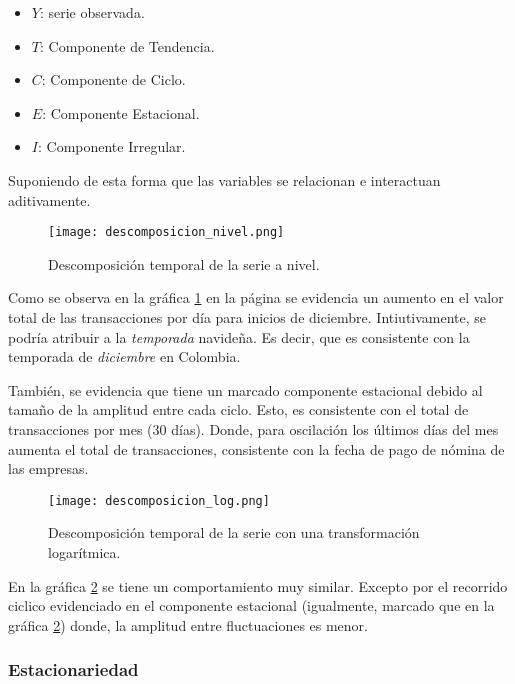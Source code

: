 \documentclass[a4paper]{article}
\begin{document}
\begin{itemize}
	\item $Y$: serie observada.
	\item $T$: Componente de Tendencia.
	\item $C$: Componente de Ciclo.
	\item $E$: Componente Estacional.
	\item $I$: Componente Irregular.
\end{itemize}

Suponiendo de esta forma que las variables se relacionan e interactuan aditivamente.

\begin{figure}[h]
    \centering
	\texttt{[image: descomposicion\_nivel.png]}
    \caption{Descomposición temporal de la serie a nivel.}
    \label{fig:descomposicion_nivel}
\end{figure}

Como se observa en la gráfica \ref{fig:descomposicion_nivel} en la página \pageref{fig:descomposicion_nivel} se evidencia un aumento en el valor total de las transacciones por día para inicios de diciembre. Intiutivamente, se podría atribuir a la \textit{temporada} navideña. Es decir, que es consistente con la temporada de \textit{diciembre} en Colombia.

También, se evidencia que tiene un marcado componente estacional debido al tamaño de la amplitud entre cada ciclo. Esto, es consistente con el total de transacciones por mes (30 días). Donde, para oscilación los últimos días del mes aumenta el total de transacciones, consistente con la fecha de pago de nómina de las empresas.

\begin{figure}[h]
    \centering
	\texttt{[image: descomposicion\_log.png]}
    \caption{Descomposición temporal de la serie con una transformación logarítmica.}
    \label{fig:descomposicion_log}
\end{figure}

En la gráfica \ref{fig:descomposicion_log} se tiene un comportamiento muy similar. Excepto por el recorrido ciclico evidenciado en el componente estacional (igualmente, marcado que en la gráfica \ref{fig:descomposicion_log}) donde, la amplitud entre fluctuaciones es menor.

\subsubsection*{Estacionariedad}
\end{document}
